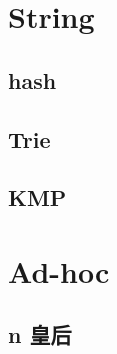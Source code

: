 \section{String}

\subsection{hash}


\subsection{Trie}


\subsection{KMP}


\section{Ad-hoc}

\subsection{n 皇后}

